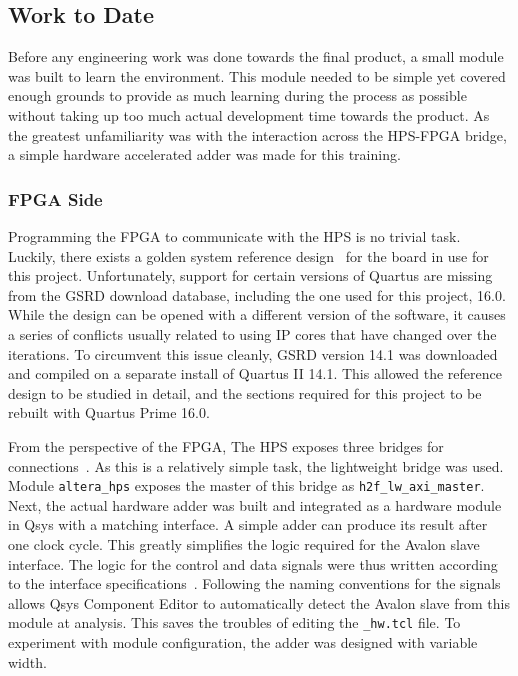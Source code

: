 \subsection{Work to Date}
Before any engineering work was done towards the final product, a small module
was built to learn the environment.
This module needed to be simple yet covered enough grounds to provide as much
learning during the process as possible without taking up too much actual
development time towards the product.
As the greatest unfamiliarity was with the interaction across the HPS-FPGA
bridge, a simple hardware accelerated adder was made for this training.

\subsubsection{FPGA Side}
Programming the FPGA to communicate with the HPS is no trivial task.
Luckily, there exists a golden system reference design~\cite{Rocket1} for
the board in use for this project.
Unfortunately, support for certain versions of Quartus are missing from
the GSRD download database, including the one used for this project, 16.0.
While the design can be opened with a different version of the software,
it causes a series of conflicts usually related to using IP cores that
have changed over the iterations.
To circumvent this issue cleanly, GSRD version 14.1 was downloaded and compiled
on a separate install of Quartus II 14.1.
This allowed the reference design to be studied in detail, and the sections
required for this project to be rebuilt with Quartus Prime 16.0.

From the perspective of the FPGA, The HPS exposes three bridges for
connections~\cite{Altera6}.
As this is a relatively simple task, the lightweight bridge was used.
Module \texttt{altera\_hps} exposes the master of this bridge as
\texttt{h2f\_lw\_axi\_master}.
Next, the actual hardware adder was built and integrated as a hardware
module in Qsys with a matching interface.
A simple adder can produce its result after one clock cycle.
This greatly simplifies the logic required for the Avalon slave interface.
The logic for the control and data signals were thus written according to the
interface specifications~\cite{Intel3}.
Following the naming conventions for the signals allows Qsys Component Editor
to automatically detect the Avalon slave from this module at analysis.
This saves the troubles of editing the \texttt{\_hw.tcl} file.
To experiment with module configuration, the adder was designed with variable
width.

